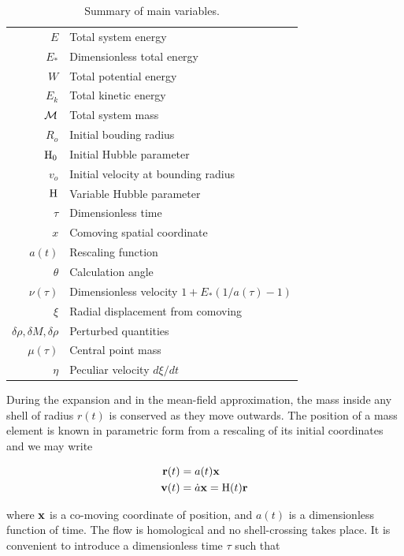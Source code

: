 \begin{table}
\begin{center}
\caption{Summary of main variables.}
\label{Tab:identities}
\begin{tabularx}{\columnwidth}{rl}
\hline
$E$ & Total system energy \\
$E_*$ & Dimensionless total energy \\
$W$ & Total potential energy \\
$E_k$ & Total kinetic energy\\
$\cal M$ & Total system mass\\
$R_o$ & Initial bouding radius\\
${\textrm{H}}_0$ & Initial Hubble parameter\\
$v_o$ & Initial velocity at bounding radius\\
${\textrm{H}}$ & Variable Hubble parameter\\
$\tau$ & Dimensionless time\\
$x$ & Comoving spatial coordinate\\
$a(t)$ & Rescaling function\\
$\theta$ & Calculation angle\\
$\nu(\tau)$ & Dimensionless velocity $1 + E_*(1/a(\tau)-1)$\\
$\xi$ & Radial displacement from comoving \\
$\delta\rho,\delta M,\delta\rho$ & Perturbed quantities\\
$\mu(\tau)$ & Central point mass\\
$\eta$ & Peculiar velocity $d\xi/dt$\\
\hline
\end{tabularx}
\end{center}
\end{table}

During the expansion and in the mean-field approximation, the mass inside any shell of radius $r(t)$ is conserved as they move outwards. The position of a mass element is known in parametric form from a rescaling of its initial coordinates and we may write 

\begin{align} 
\bold{r}(t) &= a(t)\bold{x}\\
\bold{v}(t) &= \dot{a}\bold{x} = {\textrm{H}}(t)\bold{r} 
\end{align} 

 where $\bold{x}$ is a co-moving coordinate of position, and $a(t)$ is a dimensionless function of time. The flow is homological and no shell-crossing takes place. It is convenient to introduce a dimensionless time $\tau$ such that 
 
